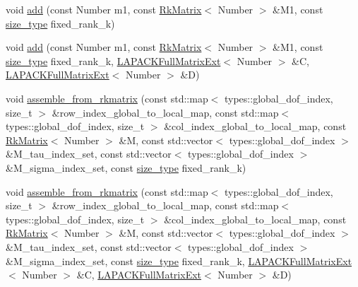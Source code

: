 \begin{DoxyCompactItemize}
\item 
void \hyperlink{classRkMatrix_adb27c4eacf80d4e94c20ff96eaf5564d}{add} (const Number m1, const \hyperlink{classRkMatrix}{Rk\+Matrix}$<$ Number $>$ \&M1, const \hyperlink{classRkMatrix_add060bfc3a4cc77f858c3d6dd58cadd5}{size\+\_\+type} fixed\+\_\+rank\+\_\+k)
\item 
void \hyperlink{classRkMatrix_aeb4978452e819b66d571f9447643d547}{add} (const Number m1, const \hyperlink{classRkMatrix}{Rk\+Matrix}$<$ Number $>$ \&M1, const \hyperlink{classRkMatrix_add060bfc3a4cc77f858c3d6dd58cadd5}{size\+\_\+type} fixed\+\_\+rank\+\_\+k, \hyperlink{classLAPACKFullMatrixExt}{L\+A\+P\+A\+C\+K\+Full\+Matrix\+Ext}$<$ Number $>$ \&C, \hyperlink{classLAPACKFullMatrixExt}{L\+A\+P\+A\+C\+K\+Full\+Matrix\+Ext}$<$ Number $>$ \&D)
\item 
void \hyperlink{classRkMatrix_a9ff620f9f71181c794e129d71d76da7c}{assemble\+\_\+from\+\_\+rkmatrix} (const std\+::map$<$ types\+::global\+\_\+dof\+\_\+index, size\+\_\+t $>$ \&row\+\_\+index\+\_\+global\+\_\+to\+\_\+local\+\_\+map, const std\+::map$<$ types\+::global\+\_\+dof\+\_\+index, size\+\_\+t $>$ \&col\+\_\+index\+\_\+global\+\_\+to\+\_\+local\+\_\+map, const \hyperlink{classRkMatrix}{Rk\+Matrix}$<$ Number $>$ \&M, const std\+::vector$<$ types\+::global\+\_\+dof\+\_\+index $>$ \&M\+\_\+tau\+\_\+index\+\_\+set, const std\+::vector$<$ types\+::global\+\_\+dof\+\_\+index $>$ \&M\+\_\+sigma\+\_\+index\+\_\+set, const \hyperlink{classRkMatrix_add060bfc3a4cc77f858c3d6dd58cadd5}{size\+\_\+type} fixed\+\_\+rank\+\_\+k)
\item 
void \hyperlink{classRkMatrix_aa72bfae68c9471808314edcdce3f9625}{assemble\+\_\+from\+\_\+rkmatrix} (const std\+::map$<$ types\+::global\+\_\+dof\+\_\+index, size\+\_\+t $>$ \&row\+\_\+index\+\_\+global\+\_\+to\+\_\+local\+\_\+map, const std\+::map$<$ types\+::global\+\_\+dof\+\_\+index, size\+\_\+t $>$ \&col\+\_\+index\+\_\+global\+\_\+to\+\_\+local\+\_\+map, const \hyperlink{classRkMatrix}{Rk\+Matrix}$<$ Number $>$ \&M, const std\+::vector$<$ types\+::global\+\_\+dof\+\_\+index $>$ \&M\+\_\+tau\+\_\+index\+\_\+set, const std\+::vector$<$ types\+::global\+\_\+dof\+\_\+index $>$ \&M\+\_\+sigma\+\_\+index\+\_\+set, const \hyperlink{classRkMatrix_add060bfc3a4cc77f858c3d6dd58cadd5}{size\+\_\+type} fixed\+\_\+rank\+\_\+k, \hyperlink{classLAPACKFullMatrixExt}{L\+A\+P\+A\+C\+K\+Full\+Matrix\+Ext}$<$ Number $>$ \&C, \hyperlink{classLAPACKFullMatrixExt}{L\+A\+P\+A\+C\+K\+Full\+Matrix\+Ext}$<$ Number $>$ \&D)
\end{DoxyCompactItemize}
